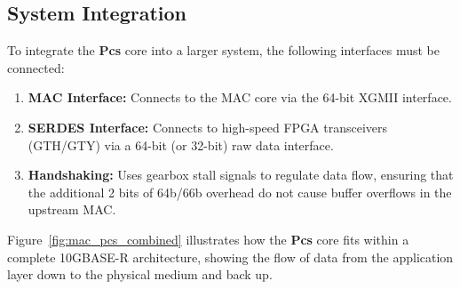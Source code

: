 \subsection{System Integration}
To integrate the \textbf{Pcs} core into a larger system, the following interfaces must be connected:
\begin{enumerate}
    \item \textbf{MAC Interface:} Connects to the MAC core via the 64-bit XGMII interface.
    \item \textbf{SERDES Interface:} Connects to high-speed FPGA transceivers (GTH/GTY) via a 64-bit (or 32-bit) raw data interface.
    \item \textbf{Handshaking:} Uses gearbox stall signals to regulate data flow, ensuring that the additional 2 bits of 64b/66b overhead do not cause buffer overflows in the upstream MAC.
\end{enumerate}

Figure~\ref{fig:mac_pcs_combined} illustrates how the \textbf{Pcs} core fits within a complete 10GBASE-R architecture, showing the flow of data from the application layer down to the physical medium and back up.

